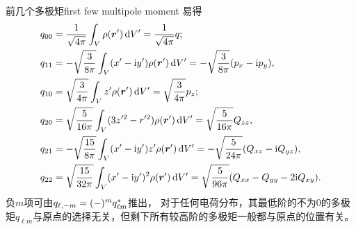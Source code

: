 
\begin{example}{前几个多极矩}{first few multipole moment}
    易得
    \begin{subequations}
        \begin{align}
            q_{00} &= \frac1{\sqrt{4\pi}}\int_V\rho(\bm r')\mathop{}\!\mathrm{d} V' = \frac1{\sqrt{4\pi}}q;\\
            q_{11} &= -\sqrt{\frac3{8\pi}}\int_V(x' - \mathrm{i} y')\rho(\bm r')\mathop{}\!\mathrm{d} V' = -\sqrt{\frac3{8\pi}}(p_x - \mathrm{i} p_y),\\
            q_{10} &= \sqrt{\frac3{4\pi}}\int_V z'\rho(\bm r')\mathop{}\!\mathrm{d} V' = \sqrt{\frac3{4\pi}}p_z;\\
            q_{20} &= \sqrt{\frac5{16\pi}}\int_V(3z'^2 - r'^2)\rho(\bm r')\mathop{}\!\mathrm{d} V' = \sqrt{\frac5{16\pi}}Q_{zz},\\
            q_{21} &= -\sqrt{\frac{15}{8\pi}}\int_V(x' - \mathrm{i} y')z'\rho(\bm r')\mathop{}\!\mathrm{d} V' = -\sqrt{\frac5{24\pi}}(Q_{xz} - \mathrm{i} Q_{yz}),\\
            q_{22} &= \sqrt{\frac{15}{32\pi}}\int_V(x' - \mathrm{i} y')^2\rho(\bm r')\mathop{}\!\mathrm{d} V' = \sqrt{\frac5{96\pi}}(Q_{xx} - Q_{yy} - 2\mathrm{i} Q_{xy}).
        \end{align}
    \end{subequations}
    负$m$项可由$q_{\ell,-m} = (-)^mq_{\ell m}^\ast$推出，
    \tcblower
    对于任何电荷分布，其最低阶的不为0的多极矩$q_{\ell m}$与原点的选择无关，但剩下所有较高阶的多极矩一般都与原点的位置有关。
\end{example}

